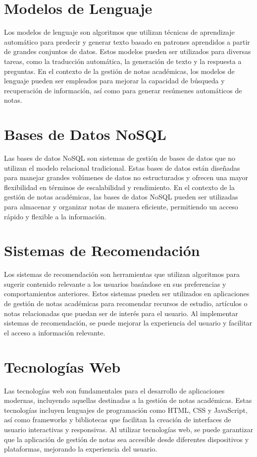 \section{Modelos de Lenguaje}
Los modelos de lenguaje son algoritmos que utilizan técnicas de aprendizaje automático para predecir y generar
texto basado en patrones aprendidos a partir de grandes conjuntos de datos. Estos modelos pueden ser utilizados para diversas tareas, como la traducción automática, la generación de texto y la respuesta a preguntas. En el contexto de la gestión de notas académicas, los modelos de lenguaje pueden ser empleados para mejorar la capacidad de búsqueda y recuperación de información, así como para generar resúmenes automáticos de notas.\cite{llm} 
\section{Bases de Datos NoSQL}
Las bases de datos NoSQL son sistemas de gestión de bases de datos que no utilizan el modelo relacional tradicional. Estas bases de datos están diseñadas para manejar grandes volúmenes de datos no estructurados y ofrecen una mayor flexibilidad en términos de escalabilidad y rendimiento. En el contexto de la gestión de notas académicas, las bases de datos NoSQL pueden ser utilizadas para almacenar y organizar notas de manera eficiente, permitiendo un acceso rápido y flexible a la información.\cite{basededatosnosql}

\vspace{1cm}
\section{Sistemas de Recomendación}
Los sistemas de recomendación son herramientas que utilizan algoritmos para sugerir contenido relevante a los usuarios basándose en sus preferencias y comportamientos anteriores. Estos sistemas pueden ser utilizados en aplicaciones de gestión de notas académicas para recomendar recursos de estudio, artículos o notas relacionadas que puedan ser de interés para el usuario. Al implementar sistemas de recomendación, se puede mejorar la experiencia del usuario y facilitar el acceso a información relevante.\cite{sistemas_recomendacion}    

\vspace{1cm}
\section{Tecnologías Web}
Las tecnologías web son fundamentales para el desarrollo de aplicaciones modernas, incluyendo aquellas destinadas a la gestión de notas académicas. Estas tecnologías incluyen lenguajes de programación como HTML, CSS y JavaScript, así como frameworks y bibliotecas que facilitan la creación de interfaces de usuario interactivas y responsivas. Al utilizar tecnologías web, se puede garantizar que la aplicación de gestión de notas sea accesible desde diferentes dispositivos y plataformas, mejorando la experiencia del usuario.\cite{teconologias_web}   

